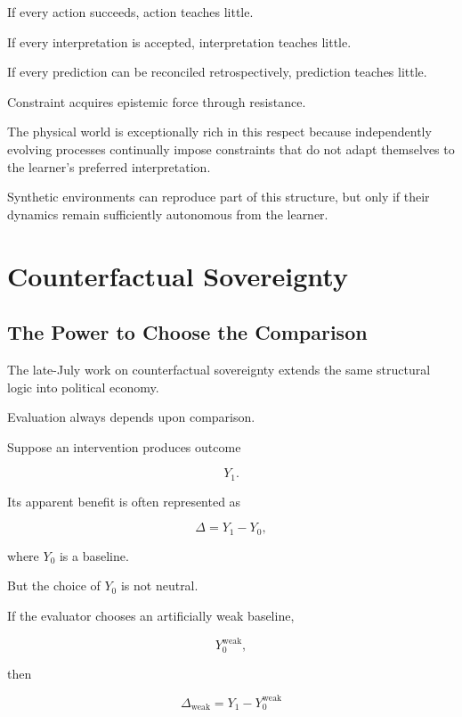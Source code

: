 \documentclass[11pt]{article}
\theoremstyle{remark}
\begin{document}
If every action succeeds, action teaches little.

If every interpretation is accepted, interpretation teaches little.

If every prediction can be reconciled retrospectively, prediction teaches little.

Constraint acquires epistemic force through resistance.

The physical world is exceptionally rich in this respect because independently evolving processes continually impose constraints that do not adapt themselves to the learner's preferred interpretation.

Synthetic environments can reproduce part of this structure, but only if their dynamics remain sufficiently autonomous from the learner.

\section{Counterfactual Sovereignty}

\subsection{The Power to Choose the Comparison}

The late-July work on counterfactual sovereignty extends the same structural logic into political economy.

Evaluation always depends upon comparison.

Suppose an intervention produces outcome

\begin{equation}
Y_1.
\end{equation}

Its apparent benefit is often represented as

\begin{equation}
\Delta
=
Y_1-Y_0,
\end{equation}

where $Y_0$ is a baseline.

But the choice of $Y_0$ is not neutral.

If the evaluator chooses an artificially weak baseline,

\begin{equation}
Y_0^{\mathrm{weak}},
\end{equation}

then

\begin{equation}
\Delta_{\mathrm{weak}}
=
Y_1-Y_0^{\mathrm{weak}}
\end{equation}
\end{document}
